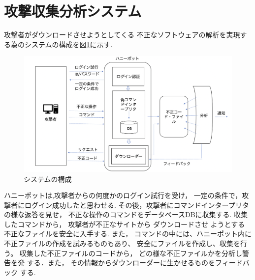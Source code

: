 \documentclass{entry}
\begin{document}
\section{攻撃収集分析システム}


攻撃者がダウンロードさせようとしてくる
不正なソフトウェアの解析を実現する為のシステムの構成を図\ref{fig:system}に示す.

\begin{figure}[htbp]
	\centering
 	\includegraphics[width=\linewidth]{hpsystem2.png}
 	\caption{システムの構成}\label{fig:system}
\end{figure}







ハニーポットは,攻撃者からの何度かのログイン試行を受け，
一定の条件で，攻撃者にログイン成功したと思わせる.
その後，攻撃者にコマンドインタープリタの様な返答を見せ，
不正な操作のコマンドをデータベースDBに収集する.
% 
収集したコマンドから，
攻撃者が不正なサイトから
ダウンロードさせ
ようとする
不正なファイルを安全に入手する.
また，
コマンドの中には、ハニーポット内に不正ファイルの作成を試みるものもあり、
安全にファイルを作成し、収集を行う。
% 
収集した不正ファイルのコードから，
どの様な不正ファイルかを分析し警告を発
する．また，
その情報からダウンローダーに生かせるものをフィードバック
する.
% 
\end{document}
